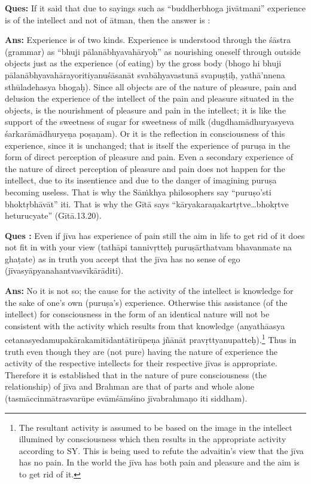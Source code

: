 \textbf{Ques:} If it said that due to sayings such as “buddherbhoga jivātmani” experience is of the intellect and not of ātman, then the answer is : 

\textbf{Ans:} Experience is of two kinds. Experience is understood through the śāstra (grammar) as “bhuji pālanābhyavahāryoḥ” as nourishing oneself through outside objects just as the experience (of eating) by the gross body (bhogo hi bhuji pālanābhyavahārayoritiyanuśāsanāt svabāhyavastunā svapuṣṭiḥ, yathā’nnena sthūladehasya bhogaḥ). Since all objects are of the nature of pleasure, pain and delusion the experience of the intellect of the pain and pleasure situated in the objects, is the nourishment of pleasure and pain in the intellect; it is like the support of the sweetness of sugar for sweetness of milk (dugdhamādhuryasyeva śarkarāmādhuryeṇa poṣaṇam). Or it is the reflection in consciousness of this experience, since it is unchanged; that is itself the experience of puruṣa in the form of direct perception of pleasure and pain. Even a secondary experience of the nature of direct perception of pleasure and pain does not happen for the intellect, due to its insentience and due to the danger of imagining puruṣa becoming useless. That is why the Sāṁkhya philosophers say “puruṣo’sti bhoktṛbhāvāt” iti. That is why the Gītā says “kāryakaraṇakartṛtve…bhokṛtve heturucyate” (Gītā.13.20).

\textbf{Ques :} Even if jīva has experience of pain still the aim in life to get rid of it does not fit in with your view (tathāpi tannivṛtteḥ puruṣārthatvam bhavanmate na ghaṭate) as in truth you accept that the jīva has no sense of ego (jīvasyāpyanahantvasvīkārāditi). 

\textbf{Ans:} No it is not so; the cause for the activity of the intellect is knowledge for the sake of one’s own (puruṣa’s) experience. Otherwise this assistance (of the intellect) for consciousness in the form of an identical nature will not be consistent with the activity which results from that knowledge (anyathāasya cetanasyedamupakārakamitīdantātirū\-peṇa jñānāt pravṛttyanupatteḥ).\footnote{The resultant activity is assumed to be based on the image in the intellect illumined by consciousness which then results in the appropriate activity according to SY. This is being used to refute the advaitin’s view that the jīva has no pain. In the world the jīva has both pain and pleasure and the aim is to get rid of it.} Thus in truth even though they are (not pure) having the nature of experience the activity of the respective intellects for their respective jīvas is appropriate. Therefore it is established that in the nature of pure consciousness (the relationship) of jīva and Brahman are that of parts and whole alone (tasmāccinmātrasvarūpe evāmśāmśino jīvabrahmaṇo iti siddham).

